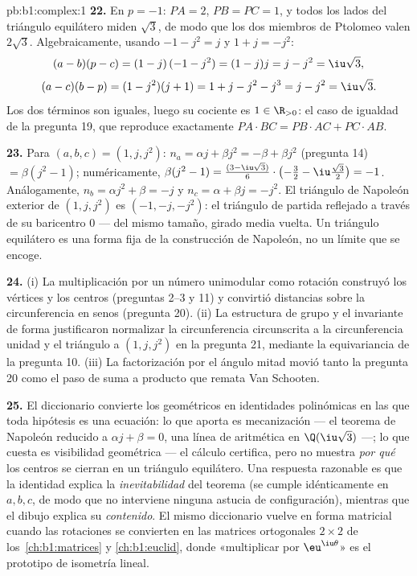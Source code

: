 \begin{solution}{pb:b1:complex:1}
\textbf{22.} En $p = -1$: $PA = 2$, $PB = PC = 1$, y todos los lados
del triángulo equilátero miden $\sqrt3$, de modo que los dos miembros
de Ptolomeo valen $2\sqrt3$. Algebraicamente, usando $-1 - j^2 = j$ y
$1 + j = -j^2$:
\[
(a - b)(p - c) = (1 - j)\,(-1 - j^2) = (1 - j)j = j - j^2
= \iu\sqrt3 ,
\]
\[
(a - c)(b - p) = (1 - j^2)(j + 1) = 1 + j - j^2 - j^3
= j - j^2 = \iu\sqrt3 .
\]
Los dos términos son iguales, luego su cociente es $1 \in \R_{>0}$: el
caso de igualdad de la pregunta 19, que reproduce exactamente
$PA \cdot BC = PB \cdot AC + PC \cdot AB$.

\textbf{23.} Para $(a, b, c) = (1, j, j^2)$: $n_a = \alpha j +
\beta j^2 = -\beta + \beta j^2$ (pregunta 14) $= \beta(j^2 - 1)$;
numéricamente, $\beta(j^2 - 1) = \frac{(3 - \iu\sqrt3)}6 \cdot
\bigl(-\frac32 - \iu\frac{\sqrt3}2\bigr) = -1$. Análogamente,
$n_b = \alpha j^2 + \beta = -j$ y $n_c = \alpha + \beta j = -j^2$. El
triángulo de Napoleón exterior de $(1, j, j^2)$ es $(-1, -j, -j^2)$: el
triángulo de partida reflejado a través de su baricentro $0$ --- del
mismo tamaño, girado media vuelta. Un triángulo equilátero es una forma
fija de la construcción de Napoleón, no un límite que se encoge.

\textbf{24.} (i) La multiplicación por un número unimodular como
rotación construyó los vértices y los centros (preguntas 2--3 y 11) y
convirtió distancias sobre la circunferencia en senos (pregunta 20).
(ii) La estructura de grupo y el invariante de forma justificaron
normalizar la circunferencia circunscrita a la circunferencia unidad y
el triángulo a $(1, j, j^2)$ en la pregunta 21, mediante la
equivariancia de la pregunta 10. (iii) La factorización por el ángulo
mitad movió tanto la pregunta 20 como el paso de suma a producto que
remata Van Schooten.

\textbf{25.} El diccionario convierte los  geométricos en
identidades polinómicas en las que toda hipótesis es una ecuación: lo
que aporta es mecanización --- el teorema de Napoleón reducido a
$\alpha j + \beta = 0$, una línea de aritmética en $\Q(\iu\sqrt3)$ ---;
lo que cuesta es visibilidad geométrica --- el cálculo certifica, pero
no muestra \emph{por qué} los centros se cierran en un triángulo
equilátero. Una respuesta razonable es que la identidad explica la
\emph{inevitabilidad} del teorema (se cumple idénticamente en
$a, b, c$, de modo que no interviene ninguna astucia de configuración),
mientras que el dibujo explica su \emph{contenido}. El mismo
diccionario vuelve en forma matricial cuando las rotaciones se
convierten en las matrices ortogonales $2 \times 2$
de los~\cref{ch:b1:matrices} y \cref{ch:b1:euclid}, donde «multiplicar
por $\eu^{\iu\theta}$» es el prototipo de isometría lineal.
\end{solution}
